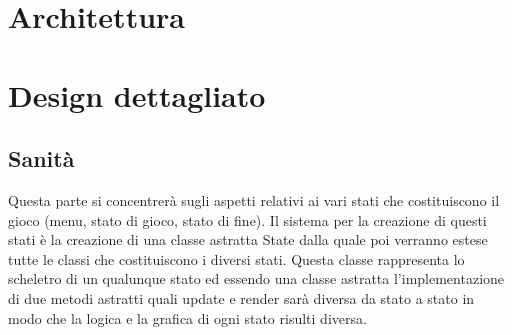 \documentclass[a4paper,12pt]{report}
\begin{document}
    \section{Architettura}
    \section{Design dettagliato}
    \subsection{Sanità}
    \par Questa parte si concentrerà sugli aspetti relativi ai vari stati che costituiscono il gioco (menu, stato di gioco, stato di fine).
     Il sistema per la creazione di questi stati è la creazione di una classe astratta State dalla quale poi verranno
     estese tutte le classi che costituiscono i diversi stati. Questa classe rappresenta lo scheletro di un qualunque
     stato ed essendo una classe astratta l’implementazione di due metodi astratti quali update e render sarà diversa da
     stato a stato in modo che la logica e la grafica di ogni stato risulti diversa.
    \par
\end{document}
